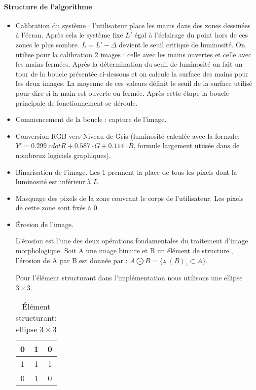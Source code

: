 \paragraph{Structure de l'algorithme}
\begin{itemize}
    \item  Calibration du système : l'utilisateur place les mains dans des zones dessinées à l'écran. Après cela le système fixe $L'$ égal à l'éclairage du point hors de ces zones le plus sombre. $L=L'-\Delta$ devient le seuil critique de luminosité. On utilise pour la calibration 2 images : celle avec les mains ouvertes et celle avec les mains fermées. Après la détermination du seuil de luminosité on fait un tour de la boucle présentée ci-dessous et on calcule la surface des mains pour les deux images. La moyenne de ces valeurs définit le seuil de la surface utilisé pour dire si la main est ouverte ou fermée. Après cette étape la boucle principale de fonctionnement se déroule.
    \item Commencement de la boucle : capture de l'image.
    \item Conversion RGB vers Niveau de Gris (luminosité calculée avec la formule: $Y'=0.299 \ cdot R + 0.587 \cdot G +  0.114 \cdot B$, formule largement utiisée dans de nombreux logiciels graphiques). 
    \item Binarisation de l'image. Les 1 prennent la place de tous les pixels dont la luminosité est inférieur à $L$.
    \item Masquage des pixels de la zone couvrant le corps de l'utilisateur. Les pixels de cette zone sont fixés à 0.
    \item Érosion de l'image.
    \par L'érosion est l'une des deux opérations fondamentales du traitement d'image morphologique. Soit A une image binaire et B un élément de structure., l'érosion de A par B est donnée par : $A \bigodot B = \{z|(B)_z \subset A\}$.
    \par Pour l'élément structurant dans l'implémentation nous utilisons une ellipse $3 \times 3$.
    \begin{table}[h]
        \centering
        \begin{tabular}{|c|c|c|}
            \hline
            0 & 1 & 0 \\ \hline
            1 & 1 & 1 \\ \hline
            0 & 1 & 0 \\ \hline
        \end{tabular}
        \caption{Élément structurant: ellipse $3 \times 3$}

\end{table}
\end{itemize}
